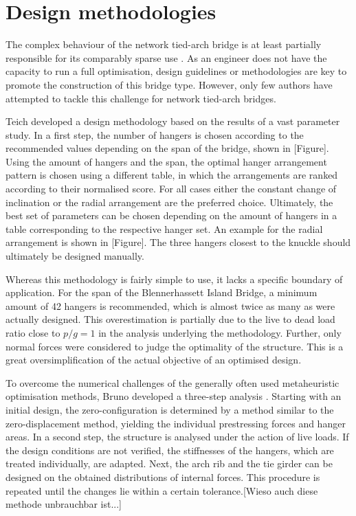 \section{Design methodologies} \label{sec:rev_meth}
The complex behaviour of the network tied-arch bridge is at least partially responsible for its comparably sparse use \cite{Tveit2}. As an engineer does not have the capacity to run a full optimisation, design guidelines or methodologies are key to promote the construction of this bridge type. However, only few authors have attempted to tackle this challenge for network tied-arch bridges.

Teich developed a design methodology based on the results of a vast parameter study. In a first step, the number of hangers is chosen according to the recommended values depending on the span of the bridge, shown in [Figure]. Using the amount of hangers and the span, the optimal hanger arrangement pattern is chosen using a different table, in which the arrangements are ranked according to their normalised score. For all cases either the constant change of inclination or the radial arrangement are the preferred choice. Ultimately, the best set of parameters can be chosen depending on the amount of hangers in a table corresponding to the respective hanger set. An example for the radial arrangement is shown in [Figure]. The three hangers closest to the knuckle should ultimately be designed manually. 

Whereas this methodology is fairly simple to use, it lacks a specific boundary of application. For the span of the Blennerhassett Island Bridge, a minimum amount of 42 hangers is recommended, which is almost twice as many as were actually designed. This overestimation is partially due to the live to dead load ratio close to $p/g=1$ in the analysis underlying the methodology. Further, only normal forces were considered to judge the optimality of the structure. This is a great oversimplification of the actual objective of an optimised design.\medskip

To overcome the numerical challenges of the generally often used metaheuristic optimisation methods, Bruno developed a three-step analysis \cite{Bruno}. Starting with an initial design, the zero-configuration is determined by a method similar to the zero-displacement method, yielding the individual prestressing forces and hanger areas. In a second step, the structure is analysed under the action of live loads. If the design conditions are not verified, the stiffnesses of the hangers, which are treated individually, are adapted. Next, the arch rib and the tie girder can be designed on the obtained distributions of internal forces. This procedure is repeated until the changes lie within a certain tolerance.[Wieso auch diese methode unbrauchbar ist...]

